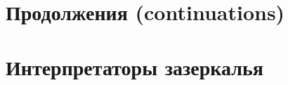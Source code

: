 \documentclass[12pt]{article}
\begin{document}








    \section{Продолжения (continuations)} \label{sec:continuations}














    \cite{reynolds1972definitional, reynolds1998definitional, defunctionalization-slides}





    \section{Интерпретаторы зазеркалья} \label{sec:wonder-interpreters}
\end{document}
